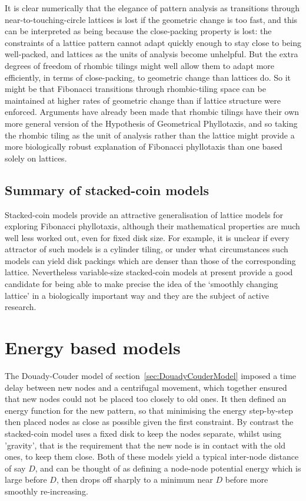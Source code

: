 It is clear numerically that the elegance of pattern analysis as transitions through near-to-touching-circle lattices is lost if the geometric change is too fast, and this can be interpreted as being because the close-packing property is lost: the constraints of a lattice pattern cannot adapt quickly enough to stay close to being well-packed,
and lattices as the units of analysis become unhelpful. 
But the extra degrees of freedom of rhombic tilings might well allow them to adapt more efficiently, in terms of close-packing, to geometric change than lattices do. So it might be that Fibonacci transitions through rhombic-tiling space can be maintained at higher rates of geometric change than if lattice structure were enforced. Arguments have already been made that rhombic tilings have their own more general version of the Hypothesis of Geometrical Phyllotaxis, and so taking the rhombic tiling as the unit of analysis rather than the lattice might provide 
a more biologically robust explanation of Fibonacci phyllotaxis than one based solely on lattices. 

\subsection{Summary of stacked-coin models}
Stacked-coin models provide an attractive generalisation of lattice models for exploring Fibonacci phyllotaxis, although their mathematical properties are much well less worked out, even for fixed disk size.  For example,  it is unclear if every attractor of such models is a cylinder tiling, or under what circumstances
 such models can yield disk packings which are denser than those of the corresponding lattice. Nevertheless variable-size  stacked-coin models at present provide a good candidate for being able to make precise the idea of the `smoothly changing lattice' in a biologically important way and they are the subject of active research.
 
\section{Energy based models}
\label{sec:energy}
The Douady-Couder model of section~\ref{sec:DouadyCouderModel} imposed a time delay between new nodes and a centrifugal movement, which together ensured that new nodes could not be placed too closely to old ones. It then defined an energy function for the new pattern, so that minimising the energy step-by-step then placed nodes as close as possible given the first constraint.  By contrast the stacked-coin model uses a fixed disk to keep the nodes separate, whilst using 'gravity', that is the requirement that the new node is in contact with the old ones, to keep them close. Both of these models yield  a typical inter-node distance of say $D$, and can be thought of as defining a  node-node potential energy which is large before $D$, then drops off sharply to a minimum near $D$ before more smoothly re-increasing. 

